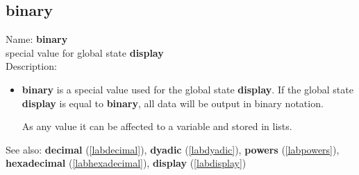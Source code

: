 \subsection{binary}
\label{labbinary}
\noindent Name: \textbf{binary}\\
special value for global state \textbf{display}\\
\noindent Description: \begin{itemize}

\item \textbf{binary} is a special value used for the global state \textbf{display}.  If
   the global state \textbf{display} is equal to \textbf{binary}, all data will be
   output in binary notation.
    
   As any value it can be affected to a variable and stored in lists.
\end{itemize}
See also: \textbf{decimal} (\ref{labdecimal}), \textbf{dyadic} (\ref{labdyadic}), \textbf{powers} (\ref{labpowers}), \textbf{hexadecimal} (\ref{labhexadecimal}), \textbf{display} (\ref{labdisplay})
